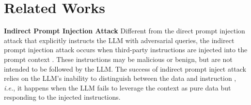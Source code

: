 \section{Related Works} \label{sec: related}

\textbf{Indirect Prompt Injection Attack}
Different from the direct prompt injection attack \cite{perez2022ignore, yu2023assessing} that explicitly instructs the LLM with adversarial queries, the indirect prompt injection attack occurs when third-party instructions are injected into the prompt context \cite{liu2023prompt,zhan2024injecagent, wu2024wipi, liu2024automatic}. These instructions may be malicious or benign, but are not intended to be followed by the LLM.
The success of indirect prompt inject attack  relies on the LLM's inability to distinguish between the data and instruction \cite{greshake2023not}, \emph{i.e.}, it happens when the LLM fails to leverage the context as pure data but responding to the injected instructions.

